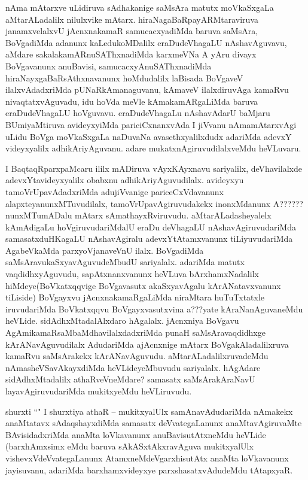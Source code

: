 \begin{artha}
nAma mAtarxve uLidiruva sAdhakanige saMsAra matutx moVkaSxgaLa aMtarALadalilx nilulxvike mAtarx. hiraNagaBaRpayARMtaraviruva janamxvelalxvU jAcnxnakamaR samucacxyadiMda baruva saMsAra, BoVgadiMda adanunx kaLedukoMDalilx eraDudeVhagaLU nAshavAguvavu, aMdare sakalakamARnuSAThxnadiMda karxmeVNa A yAru divayx BoVgavanunx anuBavisi, samucacxyAnuSAThxnadiMda hiraNayxgaBaRsAthxnavanunx hoMdudalilx laBisada BoVgaveV ilalxvAdadxriMda pUNaRkAmanaguvanu, kAmaveV ilalxdiruvAga kamaRvu nivaqtatxvAguvadu, idu hoVda meVle kAmakamARgaLiMda baruva eraDudeVhagaLU hoVguvavu. eraDudeVhagaLu nAshavAdarU baMjaru BUmiyaMtiruva avideyxyiMda pariciCxnanxvAda I jiVvanu nAmamAtarxvAgi uLidu BoVga moVkaSxgaLa naDuvaNa avasethxyalilxdudx adariMda adevxY videyxyalilx adhikAriyAguvanu. adare mukatxnAgiruvudilalxveMdu heVLuvaru.
\end{artha}

\begin{artha}
I BaqtaqRparxpaMcaru ililx mADiruva vAyxKAyxnavu sariyalilx, deVhavilalxde adevxYtavideyxyalilx obabxnu adhikAriyAguvudilalx. avideyxyu tamoVrUpavAdadxriMda adujiVvanige pariceCxVdavanunx alapxteyanunxMTuvudilalx, tamoVrUpavAgiruvudakekx inonxMdanunx A??????nunxMTumADalu mAtarx sAmathayxRviruvudu. aMtarALadasheyalelx kAmAdigaLu hoVgiruvudariMdalU eraDu deVhagaLU nAshavAgiruvudariMda samasatxduHKagaLU nAshavAgiralu adevxYtAtamxvanunx tiLiyuvudariMda AgabeVkaMda parxyoVjanaveVnU ilalx. BoVgadiMda saMsAravukaSxyavAguvudeMbudU sariyalalx. adariMda matutx vaqdidhxyAguvudu, sapAtxnanxvanunx heVLuva bArxhamxNadalilx hiMdeye(BoVkatxqqvige BoVgavasutx akaSxyavAgalu kArANatavxvanunx tiLiside) BoVgayxvu jAcnxnakamaRgaLiMda niraMtara huTuTxtatxle iruvudariMda BoVkatxqqvu BoVgayxvasutxvina a???yate kAraNanAguvaneMdu heVLide. sidAdhxMtadalAlxdaro hAgalalx. jAcnxniya BoVgavu AgAmikamaRsaMbaMdhavilalxdadxriMda punaH saMsAravaqdidhxge kArANavAguvudilalx AdudariMda ajAcnxnige mAtarx BoVgakAladalilxruva kamaRvu saMsArakekx kArANavAguvudu. aMtarALadalilxruvadeMdu nAmasheVSavAkayxdiMda heVLideyeMbuvudu sariyalalx. hAgAdare sidAdhxMtadalilx athaRveVneMdare? samasatx saMsArakAraNavU layavAgiruvudariMda mukitxyeMdu heVLiruvudu.
\end{artha}

\begin{artha}
shurxti ``\stext" I shurxtiya athaR --  mukitxyalUlx samAnavAdudariMda nAmakekx anaMtatavx sAdaqshayxdiMda samasatx deVvategaLanunx anaMtavAgiruvaMte BAvisidadxriMda anaMta loVkavanunx anuBavisutAtxneMdu heVLide (barxhAmxsimx eMdu baruva sAkASxtAkxravAguva mukitxyalUlx vishevxVdeVvategaLanunx AtamxneMdeVgarxhisutAtx anaMta loVkavanunx jayisuvanu, adariMda barxhamxvideyxye parxshasatxvAdudeMdu tAtapxyaR.
\end{artha}

